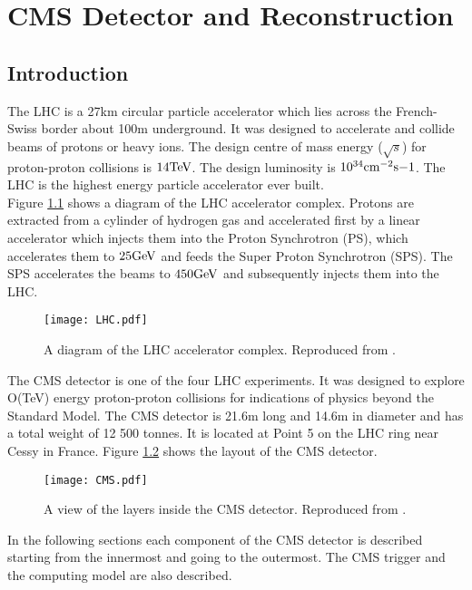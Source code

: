 \chapter{CMS Detector and Reconstruction}

\section{Introduction}

The LHC is a 27km circular particle accelerator which lies across the
French-Swiss border about 100m underground. It was designed to accelerate and 
collide beams of protons or heavy ions. The design centre of mass energy
($\sqrt{s}$) for proton-proton collisions is $14\mbox{TeV}$. The design luminosity is
$10^{34}\mbox{cm}^{-2}\mbox{s}{-1}$. The LHC is the highest energy particle accelerator ever
built. \\

Figure \ref{fig:LHC} shows a diagram of the LHC accelerator complex. Protons are
extracted from a cylinder of hydrogen gas and accelerated first by a linear
accelerator which injects them into the Proton Synchrotron (PS), which 
accelerates them to $25\mbox{GeV}$ and feeds the Super Proton Synchrotron (SPS). The
SPS accelerates the beams to $450\mbox{GeV}$ and subsequently injects them into the
LHC. \\

\begin{figure}
\texttt{[image: LHC.pdf]}
\caption{A diagram of the LHC accelerator complex. Reproduced from
\cite{physics_tdr_1}.}
\label{fig:LHC}
\end{figure}

The CMS detector is one of the four LHC experiments. It was designed to explore 
O(TeV) energy proton-proton collisions for indications of physics beyond the 
Standard Model. The CMS detector is 21.6m long and 14.6m in diameter and has a 
total weight of 12 500 tonnes. It is located at Point 5 on the LHC ring near 
Cessy in France. Figure \ref{fig:CMS} shows the layout of the CMS detector. \\

\begin{figure}
\texttt{[image: CMS.pdf]}
\caption{A view of the layers inside the CMS detector. Reproduced from
\cite{physics_tdr_1}.}
\label{fig:CMS}
\end{figure}

In the following sections each component of the CMS detector is described 
starting from the innermost and going to the outermost. The CMS trigger and the
computing model are also described. 

